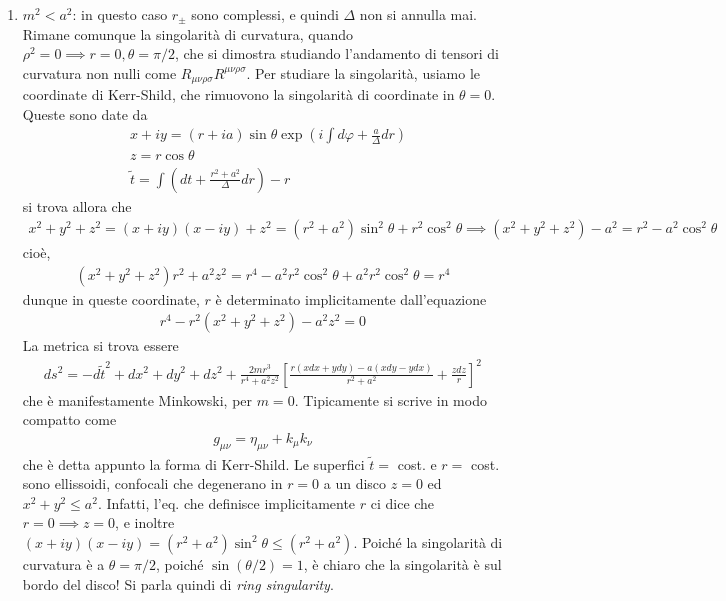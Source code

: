 \documentclass{report}
\begin{document}
\begin{enumerate}
    \item \(m^2 < a^2\): in questo caso \(r_\pm\) sono complessi, e quindi \(\Delta\) non si annulla mai. Rimane comunque la singolarità di curvatura, quando \(\rho^2 =0 \implies r=0, \theta = \pi/2\), che si dimostra studiando l'andamento di tensori di curvatura non nulli come \(R_{\mu\nu\rho\sigma}R^{\mu\nu\rho\sigma}\). Per studiare la singolarità, usiamo le coordinate di Kerr-Shild, che rimuovono la singolarità di coordinate in \(\theta = 0\). Queste sono date da 
    \begin{align}
        &x +iy = (r + ia)\sin\theta\exp\left(i\int d\varphi + \frac{a}{\Delta}dr \right) \\
        &z = r\cos\theta \\
        &\tilde{t} = \int \left(dt + \frac{r^2+a^2}{\Delta}dr \right) -r
    \end{align}
    si trova allora che
    \begin{align}
        x^2 + y^2 +z^2 = (x+iy)(x-iy) + z^2 = (r^2 + a^2)\sin^2\theta +r^2\cos^2\theta \implies (x^2+y^2+z^2)-a^2 = r^2 - a^2\cos^2\theta 
    \end{align}
    cioè, 
    \begin{align}
        (x^2+y^2+z^2)r^2 +a^2z^2 = r^4 -a^2r^2\cos^2\theta +a^2r^2\cos^2\theta = r^4
    \end{align}
    dunque in queste coordinate, \(r\) è determinato implicitamente dall'equazione 
    \begin{align}
        r^4 -r^2(x^2+y^2+z^2) - a^2z^2 = 0
    \end{align}
    La metrica si trova essere 
    \begin{align}
        ds^2 = -d\tilde{t}^2 + dx^2 + dy^2 + dz^2 + \frac{2mr^3}{r^4 + a^2z^2}\left[\frac{r(xdx+ydy) - a(xdy-ydx)}{r^2+a^2} +\frac{zdz}{r}\right]^2
    \end{align}
    che è manifestamente Minkowski, per \(m=0\). Tipicamente si scrive in modo compatto come 
    \begin{align}
        g_{\mu\nu} = \eta_{\mu\nu} + k_\mu k_\nu
    \end{align}
    che è detta appunto la forma di Kerr-Shild. Le superfici \(\tilde{t} = \) cost. e \(r = \) cost. sono ellissoidi, confocali che degenerano in \(r=0\) a un disco \(z =0\) ed \(x^2 + y^2 \leq a^2\). Infatti, l'eq. che definisce implicitamente \(r\) ci dice che \(r=0 \implies z=0\), e inoltre \((x+iy)(x-iy) = (r^2+a^2)\sin^2\theta \leq (r^2+a^2)\). Poiché la singolarità di curvatura è a \(\theta = \pi/2\), poiché \(\sin(\theta/2) = 1\), è chiaro che la singolarità è sul bordo del disco! Si parla quindi di \emph{ring singularity}. 


\end{enumerate}
\end{document}
